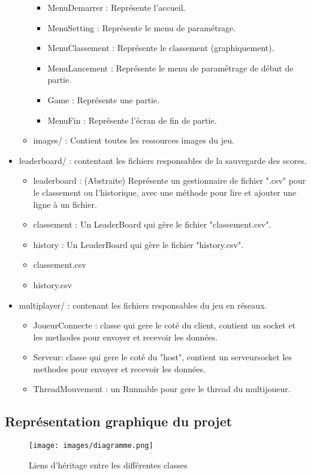 \documentclass{article}
\begin{document}
\begin{itemize}
\begin{itemize}
\begin{itemize}
            \item MenuDemarrer : Représente l'accueil.
            \item MenuSetting : Représente le menu de paramétrage.
            \item MenuClassement : Représente le classement (graphiquement).
            \item MenuLancement : Représente le menu de paramétrage de début de partie.
            \item Game : Représente une partie.
            \item MenuFin : Représente l'écran de fin de partie.
        \end{itemize}
        \item images/ : Contient toutes les ressources images du jeu.
    \end{itemize}
    \item leaderboard/ : contentant les fichiers responsables de la sauvegarde des scores.
    \begin{itemize}
        \item leaderboard : (Abstraite) Représente un gestionnaire de fichier ".csv" pour le classement ou l'historique, avec une méthode pour lire et ajouter une ligne à un fichier.
        \item classement : Un LeaderBoard qui gère le fichier "classement.csv".
        \item history : Un LeaderBoard qui gère le fichier "history.csv".
        \item classement.csv
        \item history.csv
    \end{itemize}
    \item multiplayer/ : contenant les fichiers responsables du jeu en réseaux.
    \begin{itemize}
        \item JoueurConnecte : classe qui gere le coté du client, contient un socket et les methodes pour envoyer et recevoir les données.
        \item Serveur: classe qui gere le coté du "host", contient un serveursocket les methodes pour envoyer et recevoir les données.
        \item ThreadMouvement : un Runnable pour gere le thread du multijoueur.
    \end{itemize}
\end{itemize}

\subsection{Représentation graphique du projet}
\begin{figure}[h]
        \centerline{\texttt{[image: images/diagramme.png]}}
        \caption{Liens d'héritage entre les différentes classes}
\end{figure}
\end{document}
